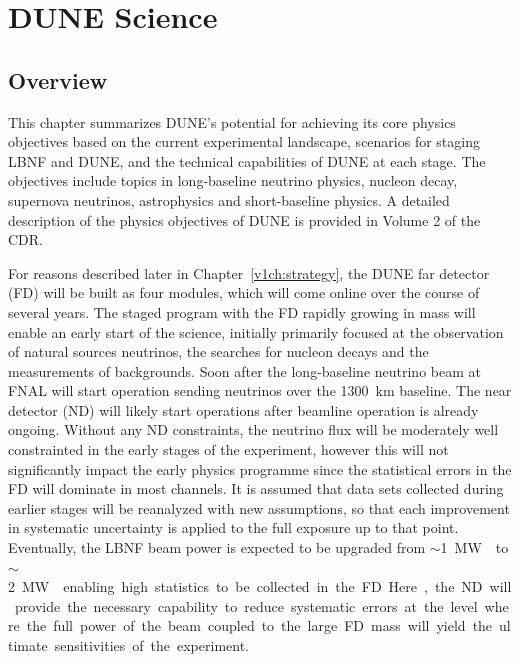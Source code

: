 
\chapter{DUNE Science}
\label{v1ch:science}

\section{Overview} %

This chapter summarizes DUNE's potential for achieving its core
physics objectives based on the current %
experimental landscape, scenarios for staging LBNF and DUNE, and the
technical capabilities of DUNE at each stage.  The objectives include
topics in long-baseline neutrino physics, nucleon decay, supernova
neutrinos, astrophysics and short-baseline physics.  A detailed
description of the physics objectives of DUNE is provided in Volume 2
of the CDR.

For reasons described later in Chapter~\ref{v1ch:strategy}, the DUNE
far detector (FD) will be built as four  modules, which will
come online over the course of several years. The staged program with
the FD rapidly growing in mass will enable an early start of the
science, initially primarily focused at the observation of natural
sources neutrinos, the searches for nucleon decays and the
measurements of backgrounds. Soon after the long-baseline neutrino
beam at FNAL will start operation sending neutrinos over the 1300~km
baseline.  The near detector (ND) will likely start operations after
beamline operation is already ongoing.  Without any ND constraints,
the neutrino flux will be moderately well constrainted in the early
stages of the experiment, however this will not significantly impact
the early physics programme since the statistical errors in the FD
will dominate in most channels.  It is assumed that data sets
collected during earlier stages will be reanalyzed with new
assumptions, so that each improvement in systematic uncertainty is
applied to the full exposure up to that point.  Eventually, the LBNF
beam power is expected to be upgraded from $\sim$\SI{1}\MW{} to
$\sim$\SI{2}\MW{} enabling high statistics to be collected in the
FD. Here, the ND will provide the necessary capability to reduce
systematic errors at the level where the full power of the beam
coupled to the large FD mass will yield the ultimate sensitivities of
the experiment.

